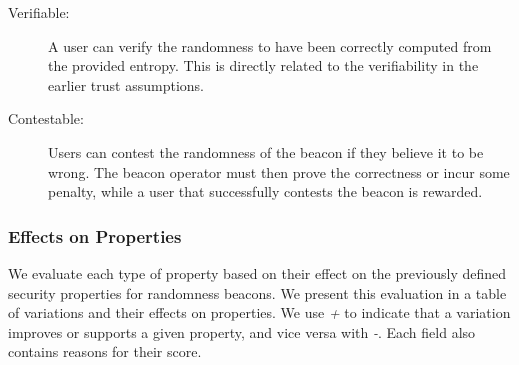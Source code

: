 \begin{description}
    \item[Verifiable:]
        A user can verify the randomness to have been correctly computed from the provided entropy.
        This is directly related to the verifiability in the earlier trust assumptions.

    \item[Contestable:]
        Users can contest the randomness of the beacon if they believe it to be wrong.
        The beacon operator must then prove the correctness or incur some penalty, while a user that successfully contests the beacon is rewarded. 
\end{description}

\subsubsection{Effects on Properties}
We evaluate each type of property based on their effect on the previously defined security properties for randomness beacons. We present this evaluation in a table of variations and their effects on properties. We use \emph{+} to indicate that a variation improves or supports a given property, and vice versa with \emph{-}. Each field also contains reasons for their score.

\newcommand{\good}[1]{$+$#1}
\newcommand{\baad}[1]{$-$#1}
\newcommand{\neut}[1]{$\pm$#1}

